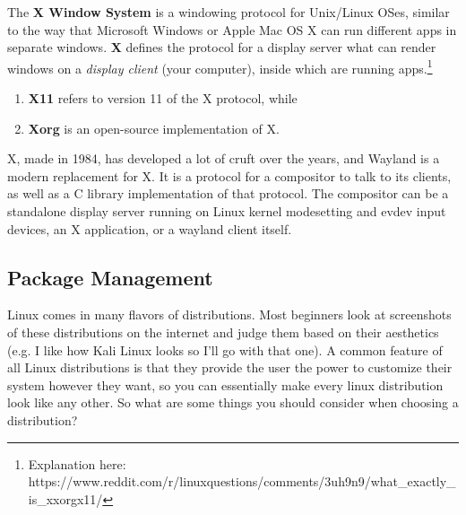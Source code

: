   \begin{definition}
    The \textbf{X Window System} is a windowing protocol for Unix/Linux OSes, similar to the way that Microsoft Windows or Apple Mac OS X can run different apps in separate windows. \textbf{X} defines the protocol for a display server what can render windows on a \textit{display client} (your computer), inside which are running apps.\footnote{Explanation here: https://www.reddit.com/r/linuxquestions/comments/3uh9n9/what\_exactly\_is\_xxorgx11/} 
    \begin{enumerate} 
      \item \textbf{X11} refers to version 11 of the X protocol, while 
      \item \textbf{Xorg} is an open-source implementation of X. 
    \end{enumerate}
  \end{definition}

  \begin{definition}[Wayland]
    X, made in 1984, has developed a lot of cruft over the years, and Wayland is a modern replacement for X. It is a protocol for a compositor to talk to its clients, as well as a C library implementation of that protocol. The compositor can be a standalone display server running on Linux kernel modesetting and evdev input devices, an X application, or a wayland client itself. 
  \end{definition}

\subsection{Package Management}
  
  Linux comes in many flavors of distributions. Most beginners look at screenshots of these distributions on the internet and judge them based on their aesthetics (e.g. I like how Kali Linux looks so I'll go with that one). A common feature of all Linux distributions is that they provide the user the power to customize their system however they want, so you can essentially make every linux distribution look like any other. So what are some things you should consider when choosing a distribution? 

